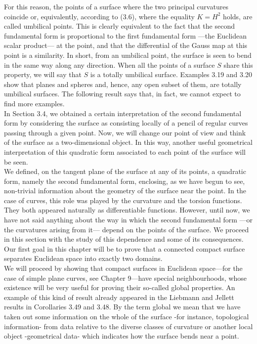 For this reason, the points of a surface where the two principal curvatures coincide or, equivalently, according to (3.6), where the equality $K = H^2$ holds, are called umbilical points. This is clearly equivalent to the fact that the second fundamental form is proportional to the first fundamental form —the Euclidean scalar product— at the point, and that the differential of the Gauss map at this point is a similarity. In short, from an umbilical point, the surface is seen to bend in the same way along any direction. When all the points of a surface $S$ share this property, we will say that $S$ is a totally umbilical surface. Examples 3.19 and 3.20 show that planes and spheres and, hence, any open subset of them, are totally umbilical surfaces. The following result says that, in fact, we cannot expect to find more examples.
${ }$\\

In Section 3.4, we obtained a certain interpretation of the second fundamental form by considering the surface as consisting locally of a pencil of regular curves passing through a given point. Now, we will change our point of view and think of the surface as a two-dimensional object. In this way, another useful geometrical interpretation of this quadratic form associated to each point of the surface will be seen.
${ }$\\

We defined, on the tangent plane of the surface at any of its points, a quadratic form, namely the second fundamental form, enclosing, as we have begun to see, non-trivial information about the geometry of the surface near the point. In the case of curves, this role was played by the curvature and the torsion functions. They both appeared naturally as differentiable functions. However, until now, we have not said anything about the way in which the second fundamental form —or the curvatures arising from it— depend on the points of the surface. We proceed in this section with the study of this dependence and some of its consequences.
${ }$\\

Our first goal in this chapter will be to prove that a connected compact surface separates Euclidean space into exactly two domains.
${ }$\\

We will proceed by showing that compact surfaces in Euclidean space—for the case of simple plane curves, see Chapter 9—have special neighbourhoods, whose existence will be very useful for proving their so-called global properties. An example of this kind of result already appeared in the Liebmann and Jellett results in Corollaries 3.49 and 3.48. By the term global we mean that we have taken out some information on the whole of the surface -for instance, topological information- from data relative to the diverse classes of curvature or another local object -geometrical data- which indicates how the surface bends near a point.
${ }$\\

